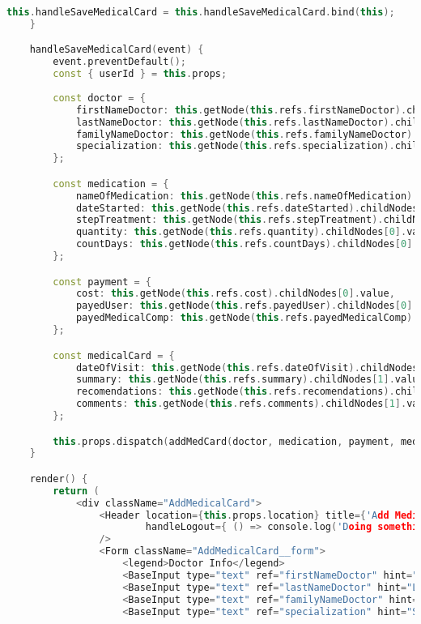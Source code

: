 \begin{lstlisting}[language=C++, style=cplusplusstyle]
        this.handleSaveMedicalCard = this.handleSaveMedicalCard.bind(this);
    }

    handleSaveMedicalCard(event) {
        event.preventDefault();
        const { userId } = this.props;
        
        const doctor = {
            firstNameDoctor: this.getNode(this.refs.firstNameDoctor).childNodes[0].value,
            lastNameDoctor: this.getNode(this.refs.lastNameDoctor).childNodes[0].value,
            familyNameDoctor: this.getNode(this.refs.familyNameDoctor).childNodes[0].value,
            specialization: this.getNode(this.refs.specialization).childNodes[0].value
        };

        const medication = {
            nameOfMedication: this.getNode(this.refs.nameOfMedication).childNodes[0].value,
            dateStarted: this.getNode(this.refs.dateStarted).childNodes[0].value,
            stepTreatment: this.getNode(this.refs.stepTreatment).childNodes[0].value,
            quantity: this.getNode(this.refs.quantity).childNodes[0].value,
            countDays: this.getNode(this.refs.countDays).childNodes[0].value
        };

        const payment = {
            cost: this.getNode(this.refs.cost).childNodes[0].value,
            payedUser: this.getNode(this.refs.payedUser).childNodes[0].value,
            payedMedicalComp: this.getNode(this.refs.payedMedicalComp).childNodes[0].value
        };

        const medicalCard = {
            dateOfVisit: this.getNode(this.refs.dateOfVisit).childNodes[0].value,
            summary: this.getNode(this.refs.summary).childNodes[1].value,
            recomendations: this.getNode(this.refs.recomendations).childNodes[1].value,
            comments: this.getNode(this.refs.comments).childNodes[1].value
        };

        this.props.dispatch(addMedCard(doctor, medication, payment, medicalCard, userId));
    }

    render() {
        return (
            <div className="AddMedicalCard">
                <Header location={this.props.location} title={'Add Medical Card'} isMainPage={false}
                        handleLogout={ () => console.log('Doing something') }
                />
                <Form className="AddMedicalCard__form">
                    <legend>Doctor Info</legend>
                    <BaseInput type="text" ref="firstNameDoctor" hint="First Name Doctor" />
                    <BaseInput type="text" ref="lastNameDoctor" hint="Last Name Doctor" />
                    <BaseInput type="text" ref="familyNameDoctor" hint="Family Name Doctor" />
                    <BaseInput type="text" ref="specialization" hint="Specialization" />


\end{lstlisting}
